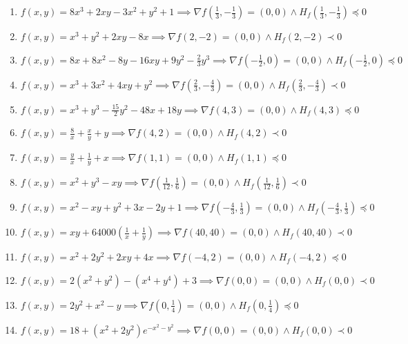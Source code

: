 \documentclass[11pt,a4paper]{article}
\begin{document}
\begin{enumerate}
\item $\displaystyle f(x, y) = 8x^{3} + 2xy - 3x^{2} + y^{2} + 1 \implies \nabla f\left( \frac{1}{3}, -\frac{1}{3} \right) = (0, 0) \land H_{f}\left( \frac{1}{3}, -\frac{1}{3} \right) \preceq 0$
\item $\displaystyle f(x, y) = x^{3} + y^{2} + 2xy - 8x \implies \nabla f(2, -2) = (0, 0) \land H_{f}(2, -2) \prec 0$
\item $\displaystyle f(x, y) = 8x + 8x^{2} - 8y - 16xy + 9y^{2} - \frac{2}{3} y^{3} \implies \nabla f\left( -\frac{1}{2}, 0 \right) = (0, 0) \land H_{f}\left( -\frac{1}{2}, 0 \right) \preceq 0$
\item $\displaystyle f(x, y) = x^{3} + 3x^{2} + 4xy + y^{2} \implies \nabla f\left( \frac{2}{3}, -\frac{4}{3} \right) = (0, 0) \land H_{f}\left( \frac{2}{3}, -\frac{4}{3} \right) \prec 0$
\item $\displaystyle f(x, y) = x^{3} + y^{3} - \frac{15}{2} y^{2} - 48x + 18y \implies \nabla f(4, 3) = (0, 0) \land H_{f}(4, 3) \preceq 0$
\item $\displaystyle f(x, y) = \frac{8}{x} + \frac{x}{y} + y \implies \nabla f(4, 2) = (0, 0) \land H_{f}(4, 2) \prec 0$
\item $\displaystyle f(x, y) = \frac{y}{x} + \frac{1}{y} + x \implies \nabla f(1, 1) = (0, 0) \land H_{f}(1, 1) \preceq 0$
\item $\displaystyle f(x, y) = x^{2} + y^{3} - xy \implies \nabla f\left( \frac{1}{12}, \frac{1}{6} \right) = (0, 0) \land H_{f}\left( \frac{1}{12}, \frac{1}{6} \right) \prec 0$
\item $\displaystyle f(x, y) = x^{2} - xy + y^{2} + 3x - 2y + 1 \implies \nabla f\left( -\frac{4}{3}, \frac{1}{3} \right) = (0, 0) \land H_{f}\left( -\frac{4}{3}, \frac{1}{3} \right) \preceq 0$
\item $\displaystyle f(x, y) = xy + 64000\left( \frac{1}{x} + \frac{1}{y} \right) \implies \nabla f(40, 40) = (0, 0) \land H_{f}(40, 40) \prec 0$
\item $\displaystyle f(x, y) = x^{2} + 2y^{2} + 2xy + 4x \implies \nabla f(-4, 2) = (0, 0) \land H_{f}(-4, 2) \preceq 0$
\item $\displaystyle f(x, y) = 2(x^{2} + y^{2}) - (x^{4} + y^{4}) + 3 \implies \nabla f(0, 0) = (0, 0) \land H_{f}(0, 0) \prec 0$
\item $\displaystyle f(x, y) = 2y^{2} + x^{2} - y \implies \nabla f\left( 0, \frac{1}{4} \right) = (0, 0) \land H_{f}\left( 0, \frac{1}{4} \right) \preceq 0$
\item $\displaystyle f(x, y) = 18 + (x^{2} + 2y^{2}) e^{-x^{2} - y^{2}} \implies \nabla f(0, 0) = (0, 0) \land H_{f}(0, 0) \prec 0$

\end{enumerate}
\end{document}
